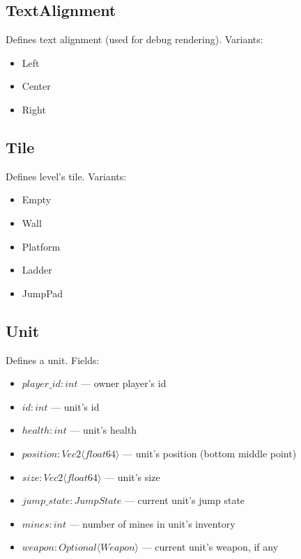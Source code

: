 \subsection{TextAlignment}
Defines text alignment (used for debug rendering). Variants:
\begin{itemize}
    \item Left
    \item Center
    \item Right
\end{itemize}

\subsection{Tile}
Defines level's tile. Variants:
\begin{itemize}
    \item Empty
    \item Wall
    \item Platform
    \item Ladder
    \item JumpPad
\end{itemize}

\subsection{Unit}
Defines a unit. Fields:
\begin{itemize}
    \item $player\_id : int$ --- owner player's id
    \item $id : int$ --- unit's id
    \item $health : int$ --- unit's health
    \item $position : Vec2 \langle float64 \rangle$ --- unit's position (bottom middle point)
    \item $size : Vec2 \langle float64 \rangle$ --- unit's size
    \item $jump\_state : JumpState$ --- current unit's jump state
    \item $mines : int$ --- number of mines in unit's inventory
    \item $weapon : Optional \langle Weapon \rangle$ --- current unit's weapon, if any
\end{itemize}

